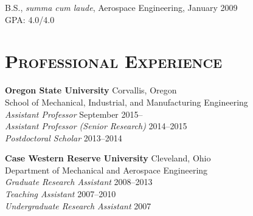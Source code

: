 \documentclass[margin,line,11pt]{res}
\newenvironment{list1}{
  \begin{list}{\ding{113}}{%
      \setlength{\itemsep}{0in}
      \setlength{\parsep}{0in} \setlength{\parskip}{0in}
      \setlength{\topsep}{0in} \setlength{\partopsep}{0in} 
      \setlength{\leftmargin}{0.17in}}}{\end{list}}
\begin{document}
\begin{resume}
\begin{list1}
\item[] B.S., \emph{summa cum laude}, Aerospace Engineering,  January 2009 \\
GPA: 4.0\slash 4.0
\end{list1}

\section{\textsc{Professional Experience}}

\textbf{Oregon State University} \hfill Corvallis, Oregon \\
School of Mechanical, Industrial, and Manufacturing Engineering \\
\emph{Assistant Professor} \hfill September 2015-- \\
\emph{Assistant Professor (Senior Research)} \hfill 2014--2015 \\
\emph{Postdoctoral Scholar} \hfill 2013--2014

\textbf{Case Western Reserve University} \hfill Cleveland, Ohio \\
Department of Mechanical and Aerospace Engineering \\
\emph{Graduate Research Assistant} \hfill 2008--2013 \\
\emph{Teaching Assistant} \hfill 2007--2010 \\
\emph{Undergraduate Research Assistant} \hfill 2007


\end{resume}
\end{document}
